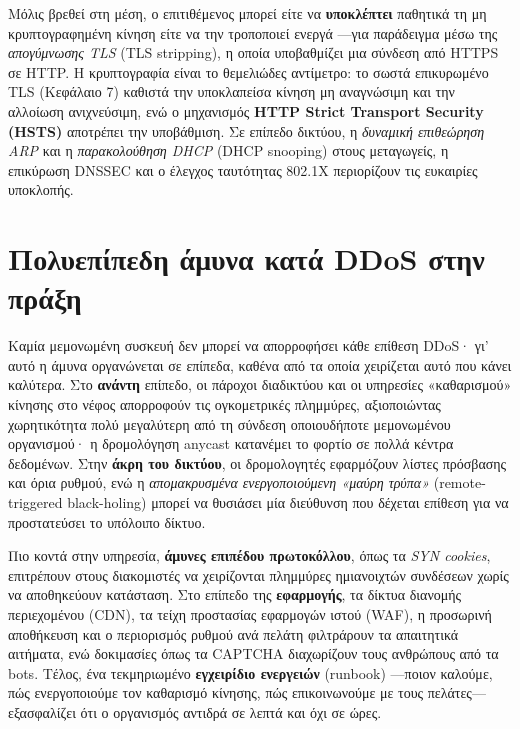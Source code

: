 \documentclass[11pt,openany]{book}
\begin{document}
Μόλις βρεθεί στη μέση, ο επιτιθέμενος μπορεί είτε να \textbf{υποκλέπτει} παθητικά τη μη κρυπτογραφημένη κίνηση είτε να την τροποποιεί ενεργά —για παράδειγμα μέσω της \emph{απογύμνωσης TLS} (TLS stripping), η οποία υποβαθμίζει μια σύνδεση από HTTPS σε HTTP. Η κρυπτογραφία είναι το θεμελιώδες αντίμετρο: το σωστά επικυρωμένο TLS (Κεφάλαιο 7) καθιστά την υποκλαπείσα κίνηση μη αναγνώσιμη και την αλλοίωση ανιχνεύσιμη, ενώ ο μηχανισμός \textbf{HTTP Strict Transport Security (HSTS)} αποτρέπει την υποβάθμιση. Σε επίπεδο δικτύου, η \emph{δυναμική επιθεώρηση ARP} και η \emph{παρακολούθηση DHCP} (DHCP snooping) στους μεταγωγείς, η επικύρωση DNSSEC και ο έλεγχος ταυτότητας 802.1X περιορίζουν τις ευκαιρίες υποκλοπής.

\section{Πολυεπίπεδη άμυνα κατά DDoS στην πράξη}\label{sec:6.4}
Καμία μεμονωμένη συσκευή δεν μπορεί να απορροφήσει κάθε επίθεση DDoS· γι' αυτό η άμυνα οργανώνεται σε επίπεδα, καθένα από τα οποία χειρίζεται αυτό που κάνει καλύτερα. Στο \textbf{ανάντη} επίπεδο, οι πάροχοι διαδικτύου και οι υπηρεσίες «καθαρισμού» κίνησης στο νέφος απορροφούν τις ογκομετρικές πλημμύρες, αξιοποιώντας χωρητικότητα πολύ μεγαλύτερη από τη σύνδεση οποιουδήποτε μεμονωμένου οργανισμού· η δρομολόγηση anycast κατανέμει το φορτίο σε πολλά κέντρα δεδομένων. Στην \textbf{άκρη του δικτύου}, οι δρομολογητές εφαρμόζουν λίστες πρόσβασης και όρια ρυθμού, ενώ η \emph{απομακρυσμένα ενεργοποιούμενη «μαύρη τρύπα»} (remote-triggered black-holing) μπορεί να θυσιάσει μία διεύθυνση που δέχεται επίθεση για να προστατεύσει το υπόλοιπο δίκτυο.

Πιο κοντά στην υπηρεσία, \textbf{άμυνες επιπέδου πρωτοκόλλου}, όπως τα \emph{SYN cookies}, επιτρέπουν στους διακομιστές να χειρίζονται πλημμύρες ημιανοιχτών συνδέσεων χωρίς να αποθηκεύουν κατάσταση. Στο επίπεδο της \textbf{εφαρμογής}, τα δίκτυα διανομής περιεχομένου (CDN), τα τείχη προστασίας εφαρμογών ιστού (WAF), η προσωρινή αποθήκευση και ο περιορισμός ρυθμού ανά πελάτη φιλτράρουν τα απαιτητικά αιτήματα, ενώ δοκιμασίες όπως τα CAPTCHA διαχωρίζουν τους ανθρώπους από τα bots. Τέλος, ένα τεκμηριωμένο \textbf{εγχειρίδιο ενεργειών} (runbook) —ποιον καλούμε, πώς ενεργοποιούμε τον καθαρισμό κίνησης, πώς επικοινωνούμε με τους πελάτες— εξασφαλίζει ότι ο οργανισμός αντιδρά σε λεπτά και όχι σε ώρες.
\end{document}
